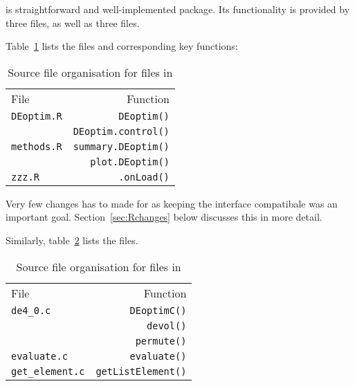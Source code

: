 \documentclass[nojss,shortnames,article]{jss}
\begin{document}
 is straightforward and well-implemented package. Its
functionality is provided by three  files, as well as three
 files. 

Table~\ref{tab:Rfiles} lists the files and corresponding key functions:

\begin{table}[htb]
  \begin{center}
    \begin{tabular}{lr}
      \toprule
      File                                          & Function \\ 
      \verb|DEoptim.R| \phantom{XXXXXXXXX}        & \verb|DEoptim()| \\
                                                   & \verb|DEoptim.control()| \\[6pt]
      \verb|methods.R|                            & \verb|summary.DEoptim()| \\
                                                   & \verb|plot.DEoptim()| \\[6pt]
      \verb|zzz.R|                                & \verb|.onLoad()| \\
      \bottomrule
    \end{tabular}
    \caption{Source file organisation for  files in }
    \label{tab:Rfiles}
  \end{center}
\end{table}

Very few changes has to made for  as keeping the interface
compatibale was an important goal. Section~\ref{sec:Rchanges} below discusses
this in more detail.

Similarly, table~\ref{tab:Cfiles} lists the  files.

\begin{table}[htb]
  \begin{center}
    \begin{tabular}{lr}
      \toprule
      File                                          & Function \\ 
      \verb|de4_0.c|              &  \verb|DEoptimC()| \\
                                   &  \verb|devol()| \\
                                   &  \verb|permute()| \\[6pt]
      \verb|evaluate.c|          &  \verb|evaluate()| \\[6pt]
      \verb|get_element.c|\phantom{XXXXXXXXX} &  \verb|getListElement()| \\

      \bottomrule
    \end{tabular}
    \caption{Source file organisation for  files in }
    \label{tab:Cfiles}
  \end{center}
\end{table}
\end{document}
